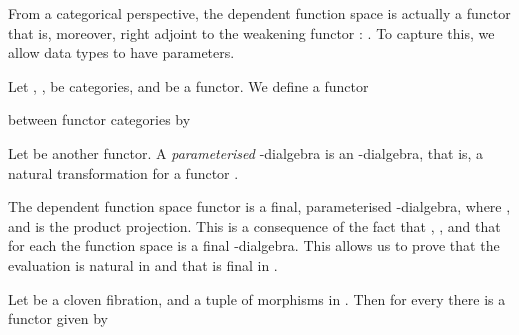 \documentclass[preprint]{sigplanconf}
\begin{document}
From a categorical perspective, the dependent function space is actually a
functor  that is, moreover, right adjoint to the
weakening functor : .
To capture this, we allow data types to have parameters.
\begin{definition}
  \label{def:parameterised-dialg}
  Let , ,  be categories, and
   be a functor.
  We define a functor
  
  between functor categories by
  
  Let  be another functor.
  A \emph{parameterised} -dialgebra is an
  -dialgebra, that is, a natural transformation
   for a functor
  .
\end{definition}

\begin{example}
  The dependent function space  functor is a final, parameterised
  -dialgebra, where
  ,
   and
   is the product projection.
  This is a consequence of the fact that ,
  , and that for each  the function
  space  is a final -dialgebra.
  This allows us to prove that the evaluation  is natural in 
  and that  is final in .
  \qedDef
\end{example}

Let  be a cloven fibration,  and 
a tuple  of morphisms  in .
Then for every  there is a functor
 given by
\end{document}
